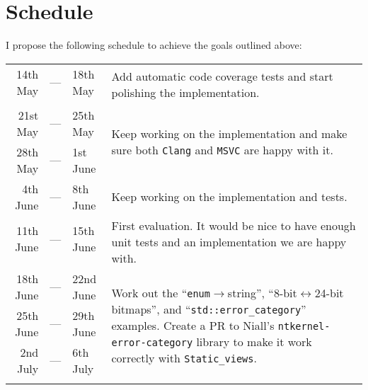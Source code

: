 \documentclass[a4paper,12pt]{article}
\begin{document}
\newpage
\section*{Schedule}
    I propose the following schedule to achieve the goals outlined above:

    \begin{center}
    \begin{tabular}{|r c l|p{10cm}|}
        \hline \noalign{\smallskip}
        14th May    & --- & 18th May    & \multirow{2}{10cm}{%
            Add automatic code coverage tests and start polishing the
            implementation.%
        } \\
                    &     &             & \\
        \noalign{\smallskip} \hline \noalign{\smallskip}
        21st May    & --- & 25th May    & \multirow{2}{10cm}{%
            Keep working on the implementation and make sure both \texttt{Clang}
            and \texttt{MSVC} are happy with it.%
        } \\
        28th May    & --- & 1st  June   & \\
        \noalign{\smallskip} \hline \noalign{\smallskip}
        4th  June   & --- & 8th  June   & Keep working on the implementation and
                                          tests. \\
        \noalign{\smallskip} \hline \noalign{\smallskip}
        11th June   & --- & 15th June   & \multirow{2}{10cm}{%
            First evaluation. It would be nice to have enough unit tests and an
            implementation we are happy with.
        } \\
                    &     &             & \\
        \noalign{\smallskip} \hline \noalign{\smallskip}
        18th June   & --- & 22nd June   & \multirow{4}{10cm}{%
            Work out the ``\texttt{enum}$\to$string'',
            ``8-bit$\leftrightarrow$24-bit bitmaps'', and
            ``\texttt{std::error\_category}'' examples. Create a PR to Niall's
            \texttt{ntkernel-error-category}\cite{ntkernel-error-category}
            library to make it work correctly with \texttt{Static\_views}.
        } \\
        25th June   & --- & 29th June   & \\
        2nd  July   & --- & 6th  July   & \\
                    &     &             & \\

\end{tabular}
\end{center}
\end{document}
